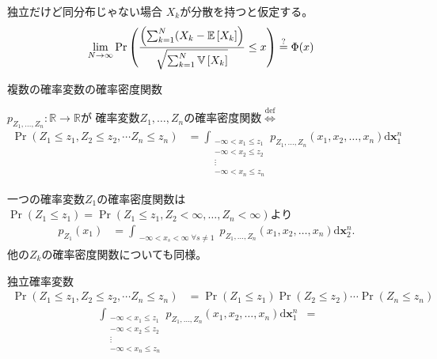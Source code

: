 \documentclass[lualatex,handout]{beamer}
\newcommand{\mycolor}[2]{%
  \begingroup
  \colorlet{currentcolor}{.}%
  \color{#1}#2%
  \color{currentcolor}%
  \endgroup
}
\newcommand{\emm}[1]{\mycolor{red}{#1}}
\newcommand{\expt}[1]{\mathbb{E}\left[#1\right]}
\newcommand{\var}[1]{\mathbb{V}\left[#1\right]}
\theoremstyle{definition}
\begin{document}
\begin{frame}{独立だけど同分布じゃない場合}
$X_k$が分散を持つと仮定する。
\begin{align*}
\lim_{N\to\infty}\Pr\left(\frac{\left(\sum_{k=1}^N (X_k-\expt{X_k}\right)}{\sqrt{\sum_{k=1}^N\var{X_k}}} \le x\right) &\stackrel{\large ?}{=} \Phi(x)
\end{align*}
\end{frame}
\fi

\begin{frame}{複数の確率変数の確率密度関数}
\small
\begin{definition}
$p_{Z_1,\dotsc,Z_n}\colon \mathbb{R}\to\mathbb{R}$が
確率変数$Z_1,\dotsc,Z_n$の確率密度関数$\stackrel{\mathrm{def}}{\iff}$
\begin{align*}
\Pr(Z_1\le z_1, Z_2\le z_2,\dotsm Z_n\le z_n)&=
\int_{\substack{-\infty< x_1 \le z_1\\ -\infty< x_2\le z_2\\\vdots\\-\infty<x_n\le z_n}} p_{Z_1,\dotsc,Z_n}(x_1,x_2,\dotsc,x_n)\mathrm{d}{\symbf{x}_1^n}
\end{align*}
\end{definition}
一つの確率変数$Z_1$の確率密度関数は$\Pr(Z_1\le z_1) = \Pr(Z_1\le z_1, Z_2 <\infty,\dotsc, Z_n<\infty)$より
\begin{align*}
p_{Z_1}(x_1)&=
\int_{\substack{-\infty< x_s <\infty \;\forall s\ne 1}} p_{Z_1,\dotsc,Z_n}(x_1,x_2,\dotsc,x_n)\mathrm{d}{\symbf{x}_2^n}.
\end{align*}
他の$Z_k$の確率密度関数についても同様。
\end{frame}

\begin{frame}{独立確率変数}
\begin{align*}
\Pr(Z_1\le z_1, Z_2\le z_2,\dotsm Z_n\le z_n)&=
\Pr(Z_1\le z_1)\Pr(Z_2\le z_2)\dotsm \Pr(Z_n\le z_n)
\end{align*}
\begin{align*}
\int_{\substack{-\infty< x_1 \le z_1\\ -\infty< x_2\le z_2\\\vdots\\-\infty<x_n\le z_n}} p_{Z_1,\dotsc,Z_n}(x_1,x_2,\dotsc,x_n)\mathrm{d}{\symbf{x}_1^n}
&=
\end{align*}
\end{frame}
\end{document}
